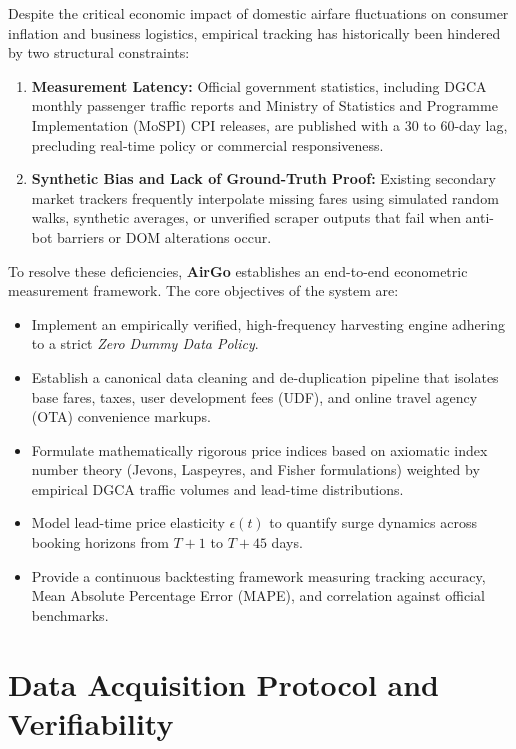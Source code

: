 \documentclass[11pt,a4paper]{article}
\begin{document}
Despite the critical economic impact of domestic airfare fluctuations on consumer inflation and business logistics, empirical tracking has historically been hindered by two structural constraints:
\begin{enumerate}[label=(\roman*)]
    \item \textbf{Measurement Latency:} Official government statistics, including DGCA monthly passenger traffic reports and Ministry of Statistics and Programme Implementation (MoSPI) CPI releases, are published with a 30 to 60-day lag, precluding real-time policy or commercial responsiveness.
    \item \textbf{Synthetic Bias and Lack of Ground-Truth Proof:} Existing secondary market trackers frequently interpolate missing fares using simulated random walks, synthetic averages, or unverified scraper outputs that fail when anti-bot barriers or DOM alterations occur.
\end{enumerate}

To resolve these deficiencies, \textbf{AirGo} establishes an end-to-end econometric measurement framework. The core objectives of the system are:
\begin{itemize}
    \item Implement an empirically verified, high-frequency harvesting engine adhering to a strict \textit{Zero Dummy Data Policy}.
    \item Establish a canonical data cleaning and de-duplication pipeline that isolates base fares, taxes, user development fees (UDF), and online travel agency (OTA) convenience markups.
    \item Formulate mathematically rigorous price indices based on axiomatic index number theory (Jevons, Laspeyres, and Fisher formulations) weighted by empirical DGCA traffic volumes and lead-time distributions.
    \item Model lead-time price elasticity $\epsilon(t)$ to quantify surge dynamics across booking horizons from $T+1$ to $T+45$ days.
    \item Provide a continuous backtesting framework measuring tracking accuracy, Mean Absolute Percentage Error (MAPE), and correlation against official benchmarks.
\end{itemize}

\section{Data Acquisition Protocol and Verifiability}
\label{sec:acquisition}
\end{document}

